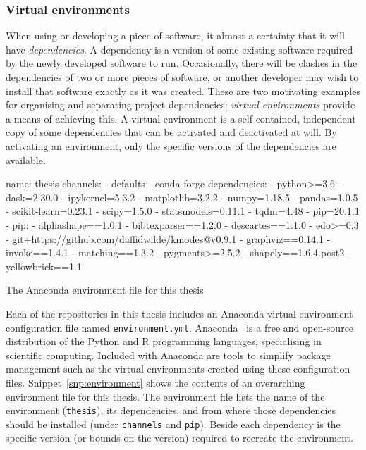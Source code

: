 \subsubsection{Virtual environments}

When using or developing a piece of software, it almost a certainty that it will
have \emph{dependencies}. A dependency is a version of some existing software
required by the newly developed software to run. Occasionally, there will be
clashes in the dependencies of two or more pieces of software, or another
developer may wish to install that software exactly as it was created. These are
two motivating examples for organising and separating project dependencies;
\emph{virtual environments} provide a means of achieving this. A virtual
environment is a self-contained, independent copy of some dependencies that can
be activated and deactivated at will. By activating an environment, only the
specific versions of the dependencies are available.

\begin{listing}[htbp]
\begin{sourceyml}
name: thesis
channels:
- defaults
- conda-forge
dependencies:
 - python>=3.6
 - dask=2.30.0
 - ipykernel=5.3.2
 - matplotlib=3.2.2
 - numpy=1.18.5
 - pandas=1.0.5
 - scikit-learn=0.23.1
 - scipy=1.5.0
 - statsmodels=0.11.1
 - tqdm=4.48
 - pip=20.1.1
 - pip:
   - alphashape==1.0.1
   - bibtexparser==1.2.0
   - descartes==1.1.0
   - edo>=0.3
   - git+https://github.com/daffidwilde/kmodes@v0.9.1
   - graphviz==0.14.1
   - invoke==1.4.1
   - matching==1.3.2
   - pygments>=2.5.2
   - shapely==1.6.4.post2
   - yellowbrick==1.1
\end{sourceyml}
\caption{The Anaconda environment file for this thesis}\label{snp:environment}
\end{listing}

Each of the repositories in this thesis includes an Anaconda virtual environment
configuration file named \texttt{environment.yml}.
Anaconda~\cite{anaconda} is a free and open-source distribution of the Python
and R programming languages, specialising in scientific computing. Included with
Anaconda are tools to simplify package management such as the virtual
environments created using these configuration files.
Snippet~\ref{snp:environment} shows the contents of an overarching environment
file for this thesis. The environment file lists the name of the environment
(\texttt{thesis}), its dependencies, and from where those
dependencies should be installed (under \texttt{channels} and
\texttt{pip}). Beside each dependency is the specific version (or
bounds on the version) required to recreate the environment.

